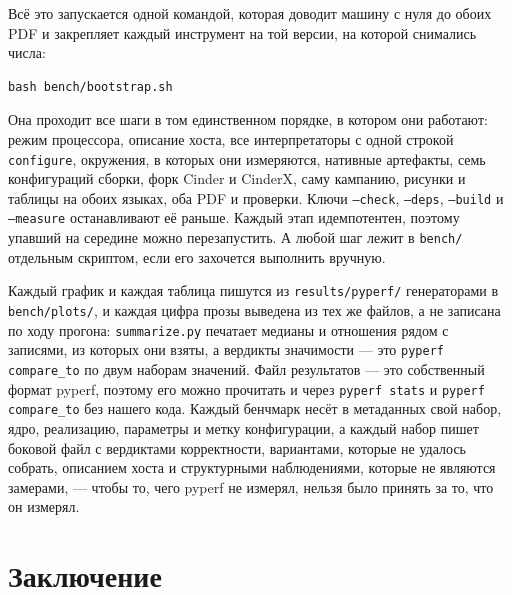 \documentclass[10pt,a4paper]{article}
\newcommand{\code}[1]{\texttt{\small #1}}
\begin{document}
Всё это запускается одной командой, которая доводит машину с нуля до обоих PDF и
закрепляет каждый инструмент на той версии, на которой снимались числа:

\begin{Verbatim}[fontsize=\small,xleftmargin=1em]
bash bench/bootstrap.sh
\end{Verbatim}

\noindent
Она проходит все шаги в том единственном порядке, в котором они работают: режим процессора,
описание хоста, все интерпретаторы с одной строкой \code{configure}, окружения, в которых они
измеряются, нативные артефакты, семь конфигураций сборки, форк Cinder и CinderX, саму кампанию,
рисунки и таблицы на обоих языках, оба PDF и проверки. Ключи \code{--check}, \code{--deps},
\code{--build} и \code{--measure} останавливают её раньше. Каждый этап идемпотентен, поэтому
упавший на середине можно перезапустить. А любой шаг лежит в \code{bench/} отдельным скриптом,
если его захочется выполнить вручную.

\noindent
Каждый график и каждая таблица пишутся из \code{results/pyperf/} генераторами в
\code{bench/plots/}, и каждая
цифра прозы выведена из тех же файлов, а не записана по ходу прогона: \code{summarize.py} печатает
медианы и отношения рядом с записями, из которых они взяты, а вердикты значимости --- это
\code{pyperf compare\_to} по двум наборам значений. Файл результатов --- это собственный формат pyperf, поэтому его можно прочитать
и через \code{pyperf stats} и \code{pyperf compare\_to} без нашего кода. Каждый бенчмарк несёт в
метаданных свой набор, ядро, реализацию, параметры и метку конфигурации, а каждый набор пишет
боковой файл с вердиктами корректности, вариантами, которые не удалось собрать, описанием хоста и
структурными наблюдениями, которые не являются замерами, --- чтобы то, чего pyperf не измерял,
нельзя было принять за то, что он измерял.

\section{Заключение}
\label{sec:conclusion}


\end{document}

